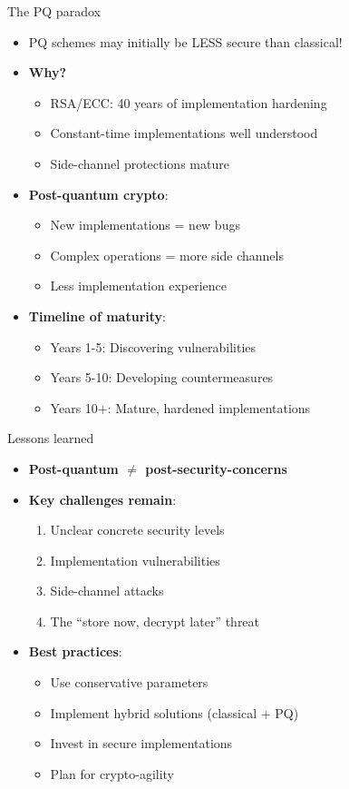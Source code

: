 \documentclass[aspectratio=169, lualatex, handout]{beamer}
\begin{document}
\begin{frame}{The PQ paradox}
	\begin{itemize}
		\item PQ schemes may initially be LESS secure than classical!
		\item \textbf{Why?}
		      \begin{itemize}
			      \item RSA/ECC: 40 years of implementation hardening
			      \item Constant-time implementations well understood
			      \item Side-channel protections mature
		      \end{itemize}
		\item \textbf{Post-quantum crypto}:
		      \begin{itemize}
			      \item New implementations = new bugs
			      \item Complex operations = more side channels
			      \item Less implementation experience
		      \end{itemize}
		\item \textbf{Timeline of maturity}:
		      \begin{itemize}
			      \item Years 1-5: Discovering vulnerabilities
			      \item Years 5-10: Developing countermeasures
			      \item Years 10+: Mature, hardened implementations
		      \end{itemize}
	\end{itemize}
\end{frame}

\begin{frame}{Lessons learned}
	\begin{itemize}
		\item \textbf{Post-quantum $\neq$ post-security-concerns}
		\item \textbf{Key challenges remain}:
		      \begin{enumerate}
			      \item Unclear concrete security levels
			      \item Implementation vulnerabilities
			      \item Side-channel attacks
			      \item The ``store now, decrypt later'' threat
		      \end{enumerate}
		\item \textbf{Best practices}:
		      \begin{itemize}
			      \item Use conservative parameters
			      \item Implement hybrid solutions (classical + PQ)
			      \item Invest in secure implementations
			      \item Plan for crypto-agility
		      \end{itemize}
	\end{itemize}
\end{frame}

\begin{frame}[plain]
	\titlepage
\end{frame}
\end{document}
